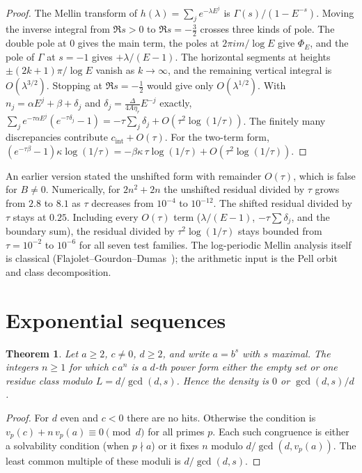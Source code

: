 \documentclass[11pt]{amsart}
\newtheorem{theorem}{Theorem}[section]
\theoremstyle{definition}
\theoremstyle{remark}
\begin{document}
\begin{proof}
The Mellin transform of $h(\lambda)=\sum_je^{-\lambda E^j}$ is $\Gamma(s)/(1-E^{-s})$. Moving the inverse integral from $\Re s>0$ to $\Re s=-\frac32$ crosses three kinds of pole. The double pole at $0$ gives the main term, the poles at $2\pi im/\log E$ give $\Phi_E$, and the pole of $\Gamma$ at $s=-1$ gives $+\lambda/(E-1)$. The horizontal segments at heights $\pm(2k+1)\pi/\log E$ vanish as $k\to\infty$, and the remaining vertical integral is $O(\lambda^{3/2})$. Stopping at $\Re s=-\frac12$ would give only $O(\lambda^{1/2})$. With $n_j=\alpha E^j+\beta+\delta_j$ and $\delta_j=\frac{\Delta}{4A\eta_r}E^{-j}$ exactly, $\sum_je^{-\tau\alpha E^j}(e^{-\tau\delta_j}-1)=-\tau\sum_j\delta_j+O(\tau^2\log(1/\tau))$. The finitely many discrepancies contribute $c_{\mathrm{int}}+O(\tau)$. For the two-term form, $(e^{-\tau\beta}-1)\kappa\log(1/\tau)=-\beta\kappa\,\tau\log(1/\tau)+O(\tau^2\log(1/\tau))$.
\end{proof}

An earlier version stated the unshifted form with remainder $O(\tau)$, which is false for $B\ne0$. Numerically, for $2n^2+2n$ the unshifted residual divided by $\tau$ grows from $2.8$ to $8.1$ as $\tau$ decreases from $10^{-4}$ to $10^{-12}$. The shifted residual divided by $\tau$ stays at $0.25$. Including every $O(\tau)$ term ($\lambda/(E-1)$, $-\tau\sum\delta_j$, and the boundary sum), the residual divided by $\tau^2\log(1/\tau)$ stays bounded from $\tau=10^{-2}$ to $10^{-6}$ for all seven test families. The log-periodic Mellin analysis itself is classical (Flajolet--Gourdon--Dumas~\cite{FGD}); the arithmetic input is the Pell orbit and class decomposition.

\section{Exponential sequences}\label{sec:exp}

\begin{theorem}\label{thm:exp}
Let $a\ge2$, $c\ne0$, $d\ge2$, and write $a=b^s$ with $s$ maximal. The integers $n\ge1$ for which $c\,a^n$ is a $d$-th power form either the empty set or one residue class modulo $L=d/\gcd(d,s)$. Hence the density is $0$ or $\gcd(d,s)/d$.
\end{theorem}

\begin{proof}
For $d$ even and $c<0$ there are no hits. Otherwise the condition is $v_p(c)+n\,v_p(a)\equiv0\pmod d$ for all primes $p$. Each such congruence is either a solvability condition (when $p\nmid a$) or it fixes $n$ modulo $d/\gcd(d,v_p(a))$. The least common multiple of these moduli is $d/\gcd(d,s)$.
\end{proof}
\end{document}
